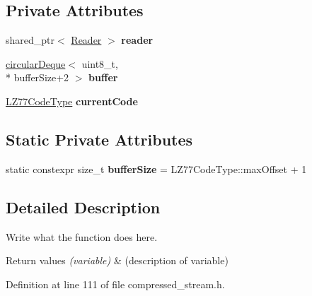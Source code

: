 \subsection*{Private Attributes}
\begin{DoxyCompactItemize}
\item 
\hypertarget{classExpandReader_abb317fa1dae74a6f01efb916dc1f1a78}{shared\+\_\+ptr$<$ \hyperlink{classReader}{Reader} $>$ {\bfseries reader}}\label{classExpandReader_abb317fa1dae74a6f01efb916dc1f1a78}

\item 
\hypertarget{classExpandReader_a75ba7c441e5d85a84432604ddbdaa734}{\hyperlink{classcircularDeque}{circular\+Deque}$<$ uint8\+\_\+t, \\*
buffer\+Size+2 $>$ {\bfseries buffer}}\label{classExpandReader_a75ba7c441e5d85a84432604ddbdaa734}

\item 
\hypertarget{classExpandReader_a3829efc17d18ef7a90c05177cea0a402}{\hyperlink{structLZ77CodeType}{L\+Z77\+Code\+Type} {\bfseries current\+Code}}\label{classExpandReader_a3829efc17d18ef7a90c05177cea0a402}

\end{DoxyCompactItemize}
\subsection*{Static Private Attributes}
\begin{DoxyCompactItemize}
\item 
\hypertarget{classExpandReader_aea9fc5ac4ca868bf23dbe48022f81d53}{static constexpr size\+\_\+t {\bfseries buffer\+Size} = L\+Z77\+Code\+Type\+::max\+Offset + 1}\label{classExpandReader_aea9fc5ac4ca868bf23dbe48022f81d53}

\end{DoxyCompactItemize}


\subsection{Detailed Description}
Write what the function does here. 


\begin{DoxyRetVals}{Return values}
{\em (variable)} & (description of variable) \\
\hline
\end{DoxyRetVals}


Definition at line 111 of file compressed\+\_\+stream.\+h.



